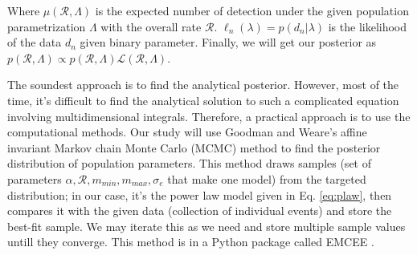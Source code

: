 \documentclass[twocolumn,prd,nofootinbib]{revtex4}
\begin{document}
Where $\mu(\mathcal{R},\Lambda)$ is the expected number of detection under the given population parametrization $\Lambda$ with the overall rate $\mathcal{R}$. $\ell_n(\lambda)=p(d_n|\lambda)$ is the likelihood of the data $d_n$ given binary parameter.
Finally, we will get our posterior as $p(\mathcal{R},\Lambda)\propto p(\mathcal{R},\Lambda)  \mathcal{L}(\mathcal{R},\Lambda)$.

The soundest approach is to find the analytical posterior. However, most of the time, it's difficult to find the analytical solution to such a complicated equation involving multidimensional integrals. Therefore, a practical approach is to use the computational methods.
Our study will use Goodman and Weare's affine invariant Markov chain Monte Carlo (MCMC) \cite{mcmc_paper} method to find the posterior distribution of population parameters. This method draws samples (set of parameters $\alpha,\mathcal{R},m_{min},m_{max},\sigma_e$ that make one model) from the targeted distribution; in our case, it's the power law model given in Eq. \ref{eq:plaw}, then compares it with the given data (collection of individual events) and store the best-fit sample. We may iterate this as we need and store multiple sample values untill they converge. 
This method is in a Python package called EMCEE \cite{emcee_paper}.





\end{document}
